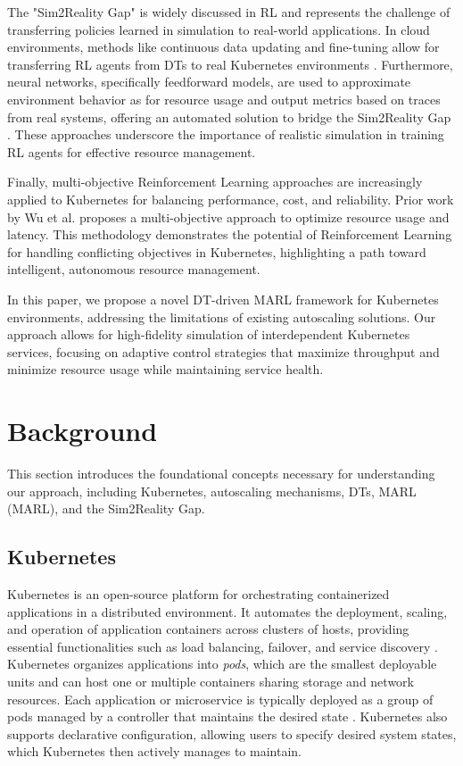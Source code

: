 \documentclass[conference]{IEEEtran}
\begin{document}
The "Sim2Reality Gap" is widely discussed in RL and represents the challenge of transferring policies learned in simulation to real-world applications. In cloud environments, methods like continuous data updating and fine-tuning allow for transferring RL agents from DTs to real Kubernetes environments \cite{nguyen_sim2reality}. Furthermore, neural networks, specifically feedforward models, are used to approximate environment behavior as for resource usage and output metrics based on traces from real systems, offering an automated solution to bridge the Sim2Reality Gap \cite{tan_nn_resource_approx}. These approaches underscore the importance of realistic simulation in training RL agents for effective resource management.

Finally, multi-objective Reinforcement Learning approaches are increasingly applied to Kubernetes for balancing performance, cost, and reliability. Prior work by Wu et al. \cite{wu_multi_objective_rl} proposes a multi-objective approach to optimize resource usage and latency. This methodology demonstrates the potential of Reinforcement Learning for handling conflicting objectives in Kubernetes, highlighting a path toward intelligent, autonomous resource management.

In this paper, we propose a novel DT-driven MARL framework for Kubernetes environments, addressing the limitations of existing autoscaling solutions. Our approach allows for high-fidelity simulation of interdependent Kubernetes services, focusing on adaptive control strategies that maximize throughput and minimize resource usage while maintaining service health.


\section{Background}
\label{sec:background}
This section introduces the foundational concepts necessary for understanding our approach, including Kubernetes, autoscaling mechanisms, DTs, MARL (MARL), and the Sim2Reality Gap.

\subsection{Kubernetes}
Kubernetes is an open-source platform for orchestrating containerized applications in a distributed environment. It automates the deployment, scaling, and operation of application containers across clusters of hosts, providing essential functionalities such as load balancing, failover, and service discovery \cite{hpa_design}. Kubernetes organizes applications into \textit{pods}, which are the smallest deployable units and can host one or multiple containers sharing storage and network resources. Each application or microservice is typically deployed as a group of pods managed by a controller that maintains the desired state \cite{rosenberg_k8s_autoscaling}. Kubernetes also supports declarative configuration, allowing users to specify desired system states, which Kubernetes then actively manages to maintain.
\end{document}
